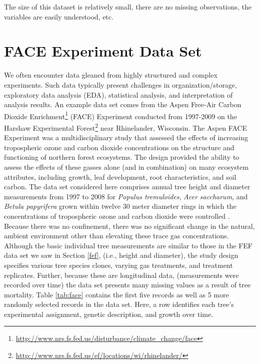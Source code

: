 \documentclass[]{krantz}
\renewcommand{\href}[2]{#2\footnote{\url{#1}}}
\theoremstyle{definition}
\theoremstyle{definition}
\theoremstyle{definition}
\theoremstyle{remark}
\begin{document}
The size of this dataset is relatively small, there are no missing
observations, the variables are easily understood, etc.

\section{FACE Experiment Data Set}\label{face-experiment-data-set}

We often encounter data gleaned from highly structured and complex
experiments. Such data typically present challenges in
organization/storage, exploratory data analysis (EDA), statistical
analysis, and interpretation of analysis results. An example data set
comes from the Aspen
\href{http://www.nrs.fs.fed.us/disturbance/climate_change/face}{Free-Air
Carbon Dioxide Enrichment} (FACE) Experiment conducted from 1997-2009 on
the \href{http://www.nrs.fs.fed.us/ef/locations/wi/rhinelander/}{Harshaw
Experimental Forest} near Rhinelander, Wisconsin. The Aspen FACE
Experiment was a multidisciplinary study that assessed the effects of
increasing tropospheric ozone and carbon dioxide concentrations on the
structure and functioning of northern forest ecosystems. The design
provided the ability to assess the effects of these gasses alone (and in
combination) on many ecosystem attributes, including growth, leaf
development, root characteristics, and soil carbon. The data set
considered here comprises annual tree height and diameter measurements
from 1997 to 2008 for \emph{Populus tremuloides}, \emph{Acer saccharum},
and \emph{Betula papyrifera} grown within twelve 30 meter diameter rings
in which the concentrations of tropospheric ozone and carbon dioxide
were controlled \citet{Kubiske2013}. Because there was no confinement,
there was no significant change in the natural, ambient environment
other than elevating these trace gas concentrations. Although the basic
individual tree measurements are similar to those in the FEF data set we
saw in Section \ref{fef}, (i.e., height and diameter), the study design
specifies various tree species clones, varying gas treatments, and
treatment replicates. Further, because these are longitudinal data,
(measurements were recorded over time) the data set presents many
missing values as a result of tree mortality. Table \ref{tab:face}
contains the first five records as well as 5 more randomly selected
records in the data set. Here, a row identifies each tree's experimental
assignment, genetic description, and growth over time.
\end{document}
